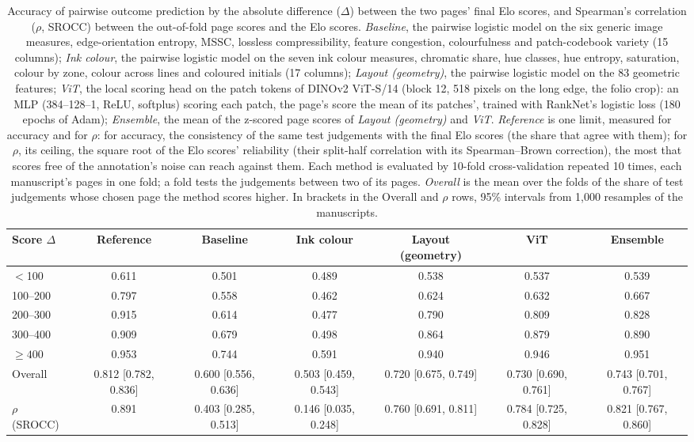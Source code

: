 \begin{table}[htbp]
  \centering
  \caption{Accuracy of pairwise outcome prediction by the absolute difference ($\Delta$) between the two pages' final Elo scores, and Spearman's correlation ($\rho$, SROCC) between the out-of-fold page scores and the Elo scores. \emph{Baseline}, the pairwise logistic model on the six generic image measures, edge-orientation entropy, MSSC, lossless compressibility, feature congestion, colourfulness and patch-codebook variety (15 columns); \emph{Ink colour}, the pairwise logistic model on the seven ink colour measures, chromatic share, hue classes, hue entropy, saturation, colour by zone, colour across lines and coloured initials (17 columns); \emph{Layout (geometry)}, the pairwise logistic model on the 83 geometric features; \emph{ViT}, the local scoring head on the patch tokens of DINOv2 ViT-S/14 (block 12, 518 pixels on the long edge, the folio crop): an MLP (384--128--1, ReLU, softplus) scoring each patch, the page's score the mean of its patches', trained with RankNet's logistic loss (180 epochs of Adam); \emph{Ensemble}, the mean of the z-scored page scores of \emph{Layout (geometry)} and \emph{ViT}. \emph{Reference} is one limit, measured for accuracy and for $\rho$: for accuracy, the consistency of the same test judgements with the final Elo scores (the share that agree with them); for $\rho$, its ceiling, the square root of the Elo scores' reliability (their split-half correlation with its Spearman--Brown correction), the most that scores free of the annotation's noise can reach against them. Each method is evaluated by 10-fold cross-validation repeated 10 times, each manuscript's pages in one fold; a fold tests the judgements between two of its pages. \emph{Overall} is the mean over the folds of the share of test judgements whose chosen page the method scores higher. In brackets in the Overall and $\rho$ rows, 95\% intervals from 1,000 resamples of the manuscripts.}
  \label{tab:methods_by_elo_gap}
  \begin{tabular}{lcccccc}
    \toprule
    Score $\Delta$ & Reference & Baseline & Ink colour & Layout (geometry) & ViT & Ensemble \\
    \midrule
    $<$100 & 0.611 & 0.501 & 0.489 & 0.538 & 0.537 & 0.539 \\
    100--200 & 0.797 & 0.558 & 0.462 & 0.624 & 0.632 & 0.667 \\
    200--300 & 0.915 & 0.614 & 0.477 & 0.790 & 0.809 & 0.828 \\
    300--400 & 0.909 & 0.679 & 0.498 & 0.864 & 0.879 & 0.890 \\
    $\geq 400$ & 0.953 & 0.744 & 0.591 & 0.940 & 0.946 & 0.951 \\
    \midrule
    Overall & 0.812 [0.782, 0.836] & 0.600 [0.556, 0.636] & 0.503 [0.459, 0.543] & 0.720 [0.675, 0.749] & 0.730 [0.690, 0.761] & 0.743 [0.701, 0.767] \\
    \midrule
    $\rho$ (SROCC) & 0.891 & 0.403 [0.285, 0.513] & 0.146 [0.035, 0.248] & 0.760 [0.691, 0.811] & 0.784 [0.725, 0.828] & 0.821 [0.767, 0.860] \\
    \bottomrule
  \end{tabular}
\end{table}
